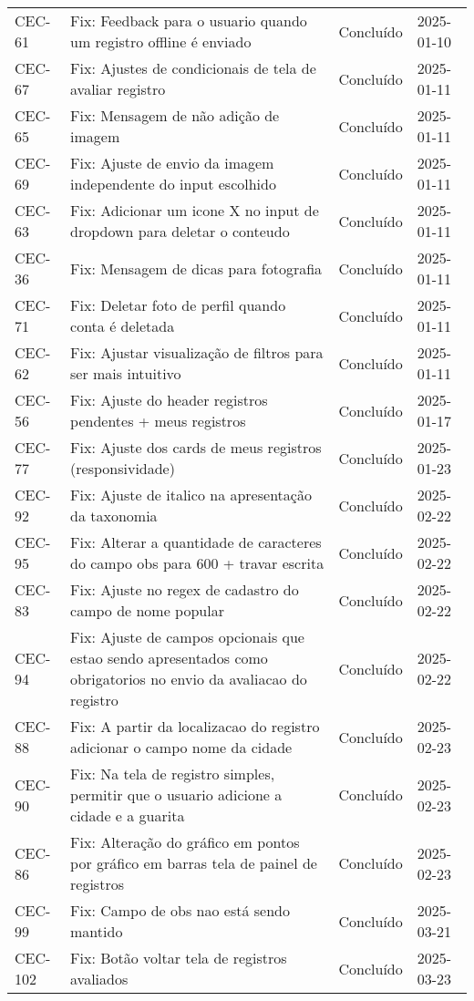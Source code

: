 \begin{longtable}{@{}lp{7cm}ll@{}}
CEC-61 & Fix: Feedback para o usuario quando um registro offline é enviado & Concluído & 2025-01-10 \\
CEC-67 & Fix: Ajustes de condicionais de tela de avaliar registro & Concluído & 2025-01-11 \\
CEC-65 & Fix: Mensagem de não adição de imagem & Concluído & 2025-01-11 \\
CEC-69 & Fix: Ajuste de envio da imagem independente do input escolhido & Concluído & 2025-01-11 \\
CEC-63 & Fix: Adicionar um icone X no input de dropdown para deletar o conteudo & Concluído & 2025-01-11 \\
CEC-36 & Fix: Mensagem de dicas para fotografia & Concluído & 2025-01-11 \\
CEC-71 & Fix: Deletar foto de perfil quando conta é deletada & Concluído & 2025-01-11 \\
CEC-62 & Fix: Ajustar visualização de filtros para ser mais intuitivo & Concluído & 2025-01-11 \\
CEC-56 & Fix: Ajuste do header registros pendentes + meus registros & Concluído & 2025-01-17 \\
CEC-77 & Fix: Ajuste dos cards de meus registros (responsividade) & Concluído & 2025-01-23 \\
CEC-92 & Fix: Ajuste de italico na apresentação da taxonomia & Concluído & 2025-02-22 \\
CEC-95 & Fix: Alterar a quantidade de caracteres do campo obs para 600 + travar escrita & Concluído & 2025-02-22 \\
CEC-83 & Fix: Ajuste no regex de cadastro do campo de nome popular & Concluído & 2025-02-22 \\
CEC-94 & Fix: Ajuste de campos opcionais que estao sendo apresentados como obrigatorios no envio da avaliacao do registro & Concluído & 2025-02-22 \\
CEC-88 & Fix: A partir da localizacao do registro adicionar o campo nome da cidade & Concluído & 2025-02-23 \\
CEC-90 & Fix: Na tela de registro simples, permitir que o usuario adicione a cidade e a guarita & Concluído & 2025-02-23 \\
CEC-86 & Fix: Alteração do gráfico em pontos por gráfico em barras tela de painel de registros & Concluído & 2025-02-23 \\
CEC-99 & Fix: Campo de obs nao está sendo mantido & Concluído & 2025-03-21 \\
CEC-102 & Fix: Botão voltar tela de registros avaliados & Concluído & 2025-03-23 \\

\end{longtable}
